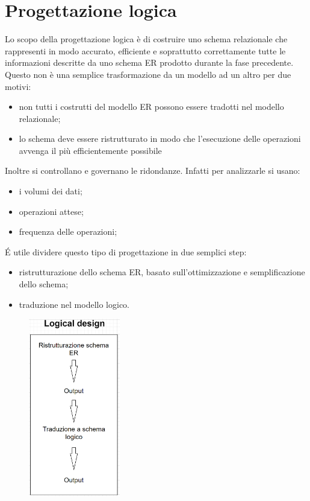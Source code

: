 \documentclass[legalpaper]{article}
\begin{document}
	\section{Progettazione logica}
		Lo scopo della progettazione logica è di costruire uno schema relazionale che rappresenti in modo accurato, efficiente e soprattutto correttamente tutte le informazioni descritte da uno schema ER prodotto durante la fase precedente. \\
		Questo non è una semplice trasformazione da un modello ad un altro per due motivi:
		\begin{itemize}
			\item non tutti i costrutti del modello ER possono essere tradotti nel modello relazionale;
			\item lo schema deve essere ristrutturato in modo che l'esecuzione delle operazioni avvenga il più efficientemente possibile
		\end{itemize}
		Inoltre si controllano e governano le ridondanze. Infatti per analizzarle si usano: 
		\begin{itemize}
			\item i volumi dei dati;
			\item operazioni attese;
			\item frequenza delle operazioni;
		\end{itemize}
		\'E utile dividere questo tipo di progettazione in due semplici step:
		\begin{itemize}
			\item ristrutturazione dello schema ER, basato sull'ottimizzazione e semplificazione dello schema;
			\item traduzione nel modello logico.
		\end{itemize}
		\begin{figure}[ht]
			\includegraphics[width=4cm]{../Parata/Schema Prog. Logica}
		\end{figure}
\end{document}
